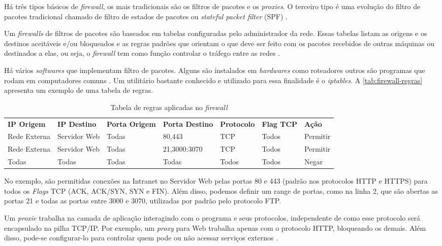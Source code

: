 Há três tipos básicos de \textit{firewall}, os mais tradicionais são os filtros de pacotes e os \textit{proxies}. O terceiro tipo é uma evolução do filtro de pacotes tradicional chamado de filtro de estados de pacotes ou \textit{stateful packet filter} (SPF) \cite{univhacker}.

Um \textit{firewalls} de filtros de pacotes são baseados em tabelas configuradas pelo administrador da rede. Essas tabelas listam as origens e os destinos aceitáveis e/ou bloqueados e as regras padrões que orientam o que deve ser feito com os pacotes recebidos de outras máquinas ou destinados a elas, ou seja, o \textit{firewall} tem como função controlar o tráfego entre as redes \cite{redesdecomputadores}. 

Há vários \textit{softwares} que implementam filtro de pacotes. Alguns são instalados em \textit{hardwares} como roteadores outros são programas que rodam em computadores comuns \cite{univhacker}. Um utilitário bastante conhecido e utilizado para essa finalidade é o \textit{iptables}. A \autoref{tab:firewall-regras} apresenta um exemplo de uma tabela de regras.

\begin{table}[htb]
\ABNTEXfontereduzida
\centering
\caption{Tabela de regras aplicadas no \textit{firewall}}
\label{tab:firewall-regras}
\begin{tabular}{l|l|l|l|l|l|l}
    \textbf{IP Origem} & \textbf{IP Destino}  & \textbf{Porta Origem}  & \textbf{Porta Destino} & \textbf{Protocolo} & \textbf{Flag TCP} & \textbf{Ação} \\
    Rede Externa & Servidor Web & Todas & 80,443 & TCP & Todos & Permitir \\
    Rede Externa & Servidor Web & Todas & 21,3000:3070 & TCP & Todos & Permitir \\
    Todas & Todas & Todas & Todas & Todos & Todos & Negar \\
\end{tabular}
\end{table}

No exemplo, são permitidas conexões na Intranet no Servidor Web pelas portas 80 e 443 (padrão nos protocolos HTTP e HTTPS) para todos os \textit{Flags} TCP (ACK, ACK/SYN, SYN e FIN). Além disso, podemos definir um range de portas, como na linha 2, que são abertas as portas 21 e todas as portas entre 3000 e 3070, utilizadas por padrão pelo protocolo FTP.

Um \textit{proxie} trabalha na camada de aplicação interagindo com o programa e seus protocolos, independente de como esse protocolo será encapsulado na pilha TCP/IP. Por exemplo, um \textit{proxy} para Web trabalha apenas com o protocolo HTTP, bloqueando os demais. Além disso, pode-se configurar-lo para controlar quem pode ou não acessar serviços externos \cite{univhacker}.

